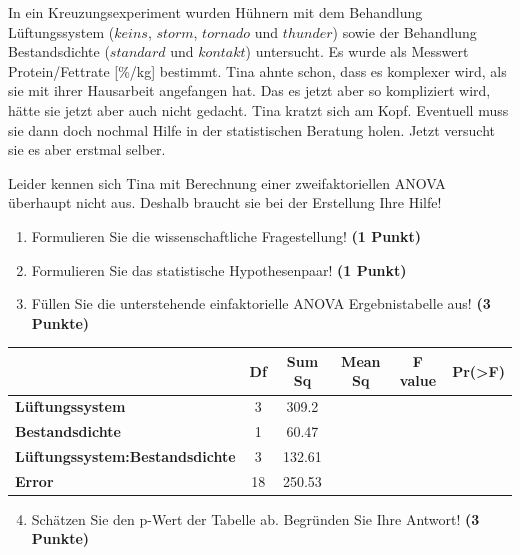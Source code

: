 \documentclass[a4paper, 9pt]{scrartcl}\usepackage[]{graphicx}\usepackage[]{xcolor}
\begin{document}
In ein Kreuzungsexperiment wurden Hühnern mit dem Behandlung Lüftungssystem ($keins$, $storm$, $tornado$ und $thunder$) sowie der Behandlung Bestandsdichte ($standard$ und $kontakt$) untersucht. Es wurde als Messwert Protein/Fettrate [\%/kg] bestimmt. Tina ahnte schon, dass es komplexer wird, als sie mit ihrer Hausarbeit angefangen hat. Das es jetzt aber so kompliziert wird, hätte sie jetzt aber auch nicht gedacht. Tina kratzt sich am Kopf. Eventuell muss sie dann doch nochmal Hilfe in der statistischen Beratung holen. Jetzt versucht sie es aber erstmal selber.



\vspace{1ex}

Leider kennen sich Tina mit Berechnung einer zweifaktoriellen ANOVA überhaupt nicht aus. Deshalb braucht sie bei der Erstellung Ihre Hilfe! 

\begin{enumerate}
  \item Formulieren Sie die wissenschaftliche Fragestellung! \textbf{(1 Punkt)}
  \item Formulieren Sie das statistische Hypothesenpaar! \textbf{(1 Punkt)}
\item Füllen Sie die unterstehende einfaktorielle ANOVA Ergebnistabelle aus! \textbf{(3 Punkte)}
\end{enumerate}

\vspace{1Ex}

\begin{center}
  \Large
  \begin{tabular}{lccccc}
  \toprule
     & \textbf{Df} & \textbf{Sum Sq} & \textbf{Mean Sq} & \textbf{F value} & \textbf{Pr(>F)} \strut\\
    \midrule
   \textbf{Lüftungssystem}  & 3 & 309.2 &  &  &  \strut\\
    \textbf{Bestandsdichte}  & 1 & 60.47 &  &  &  \strut\\
    \textbf{Lüftungssystem:Bestandsdichte}  & 3 & 132.61 &  &  &  \strut\\
   \textbf{Error}  & 18 & 250.53 &  &  &  \strut\\
\bottomrule
  \end{tabular}
\end{center}

\vspace{1Ex}

\begin{enumerate}
  \setcounter{enumi}{3}
\item Schätzen Sie den p-Wert der Tabelle ab. Begründen Sie Ihre
  Antwort! \textbf{(3 Punkte)}
\end{enumerate}
  
\end{document}
